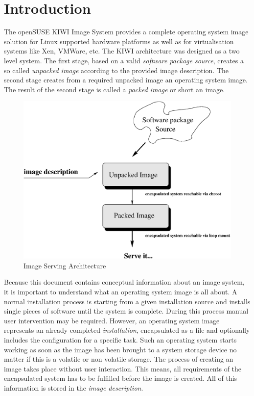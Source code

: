 \chapter{Introduction}

The openSUSE KIWI Image System provides a complete operating system
image solution for Linux supported hardware platforms as well as
for virtualisation systems like Xen, VMWare, etc. The KIWI architecture
was designed as a two level system. The first stage, based on a valid
\emph{software package source}, creates a so called \emph{unpacked image}
according to the provided image description. The second stage creates from
a required unpacked image an operating system image. The result of the
second stage is called a \emph{packed image} or short an image.

\begin{figure}[h]
\centering
\includegraphics[scale=0.5]{pictures/intro.eps}
\caption{Image Serving Architecture}
\label{fig:architecture}
\end{figure}

Because this document contains conceptual information about an image system,
it is important to understand what an operating system image is all about.
A normal installation process is starting from a given installation source
and installs single pieces of software until the system is complete. During
this process manual user intervention may be required. However, an
operating system image represents an already completed \emph{installation},
encapsulated as a file and optionally includes the configuration for a
specific task. Such an operating system starts working as soon as the
image has been brought to a system storage device no matter if this is a
volatile or non volatile storage. The process of creating an image takes
place without user interaction.
This means, all requirements of the encapsulated system has to be fulfilled
before the image is created. All of this information is stored in the
\emph{image description}.

